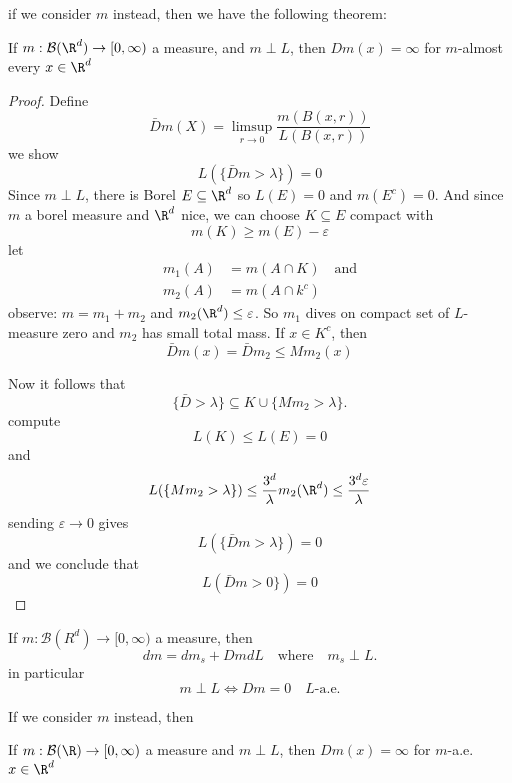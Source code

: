 \begin{remark}
	if we consider $m$ instead, then we have the following theorem:
\end{remark}

\begin{theorem}
	If $m : \mathcal{B}(\R^d) \to [0, \infty)$ a measure, and $m \perp L$, then $D m(x) = \infty$ for $m$-almost every $x \in \R^d$
\end{theorem}

\begin{proof}
	Define
	\[
		\bar{D} m(X) = \limsup_{r \to 0} \frac{m(B(x,r))}{L(B(x,r))}
	\] we show
	\[
		L(\{ \bar{D} m > \lambda \} ) = 0
	\]
	Since $m \perp L$, there is Borel $E \subseteq \R^d$ so $L(E) = 0$ and $m(E^c) = 0$.
	And since  $m$ a borel measure and $\R^d$ nice, we can choose $K \subseteq E$ compact with
	\[
		m(K) \geq m(E) - \varepsilon
	\]
	let
	\begin{align*}
		m_1 (A) &= m( A \cap K) \quad \text{and} \\
		m_2 (A) &= m(A \cap k^c)
	\end{align*}
	observe: $m = m_1 + m_2$ and $m_2 (\R^d) \leq \varepsilon$.
	So $m_1$ dives on compact set of $L$-measure zero and $m_2$ has small total mass.
	If $x \in K^c$, then
	\[
		\bar{D} m(x) = \bar{D}m_2 \leq M m_2 (x)
	\]

	Now it follows that
	\[
		\{ \bar{D} > \lambda \} \subseteq K \cup \{ M m_2 > \lambda \}.
	\] compute
	\[
		L(K) \leq L(E) = 0
	\] and
	\[
		L( \{M m_2 > \lambda \}) \leq \frac{3^d}{\lambda} m_2(\R^d) \leq \frac{3^d \varepsilon}{\lambda}
	\] sending $\varepsilon \to 0$ gives
	\[
		L( \{ \bar{D} m > \lambda \}) = 0
	\] and we conclude that
	\[
	L( \bar{D} m > 0 \}) = 0
	\]
\end{proof}


\begin{corollary}
	If $m : \mathcal{B}(R^d) \to [0,\infty)$ a measure, then
	\[
		dm = dm_s + Dm dL \quad \text{where} \quad m_s \perp L.
	\] in particular
	\[
		m \perp L \iff D m=0 \quad L\text{-a.e.}
	\]
\end{corollary}

If we consider $m$ instead, then

\begin{theorem}
	If $m: \mathcal{B}(\R) \to [0,\infty)$ a measure and $m \perp L$, then $D m(x) = \infty$ for  $m$-a.e. $x\in \R^d$
\end{theorem}

